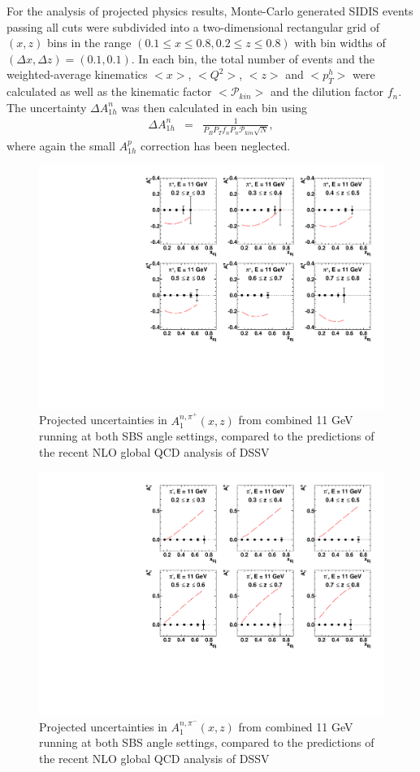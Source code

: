 For the analysis of projected physics results, Monte-Carlo generated SIDIS events passing all cuts were subdivided into a two-dimensional rectangular grid of $(x,z)$ bins in the range $(0.1 \le x \le 0.8, 0.2 \le z \le 0.8)$ with bin widths of $(\Delta x, \Delta z) = (0.1, 0.1)$. In each bin, the total number of events and the weighted-average kinematics $<x>$, $<Q^2>$, $<z>$ and $<p_T^h>$ were calculated as well as the kinematic factor $<\mathcal{P}_{kin}>$ and the dilution factor $f_n$. The uncertainty $\Delta A_{1h}^n$ was then calculated in each bin using 
\begin{eqnarray}
  \Delta A_{1h}^n &=& \frac{1}{P_BP_T f_n P_n \mathcal{P}_{kin}\sqrt{N}}\label{da1nh}, 
\end{eqnarray}
where again the small $A_{1h}^p$ correction has been neglected. 
\begin{figure}[h]
  \begin{center}
    \includegraphics[width=.75\textwidth]{figures/A1n_vs_x_E11_pip.pdf}
  \end{center}
  \caption{\label{A1n_pip_11gev} Projected uncertainties in $A_1^{n,\pi^+}(x,z)$ from combined 11 GeV running at both SBS angle settings, compared to the predictions of the recent NLO global QCD analysis of DSSV~\cite{deFlorian:2014yva}}
\end{figure}

\begin{figure}[h]
  \begin{center}
    \includegraphics[width=.75\textwidth]{figures/A1n_vs_x_E11_pim.pdf}
  \end{center}
  \caption{\label{A1n_pim_11gev} Projected uncertainties in $A_1^{n,\pi^-}(x,z)$ from combined 11 GeV running at both SBS angle settings, compared to the predictions of the recent NLO global QCD analysis of DSSV~\cite{deFlorian:2014yva}}
\end{figure}


